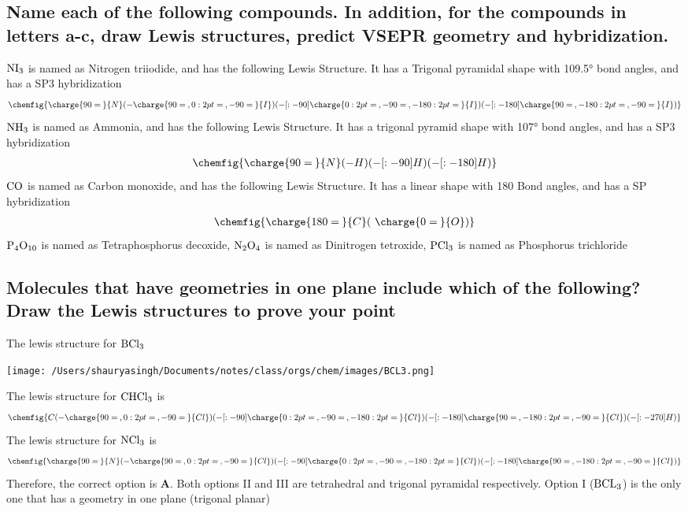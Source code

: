 \documentclass[11pt]{article}
\begin{document}
\subsection{Name each of the following compounds. In addition, for the compounds in letters a-c, draw Lewis structures, predict VSEPR geometry and hybridization.}
\label{sec:org7ee3150}
\(\ce{NI3}\) is named as Nitrogen triiodide, and has the following Lewis Structure. It has a Trigonal pyramidal shape with 109.5° bond angles, and has a SP3 hybridization
\begin{align}
\chemfig{\charge{90=\:}{N}(-\charge{90=\:, 0:2pt=\:, -90=\:}{I})(-[:-90]\charge{0:2pt=\:, -90=\:, -180:2pt=\:}{I})(-[:-180]\charge{90=\:, -180:2pt=\:, -90=\:}{I})}
\end{align}
\(\ce{NH3}\) is named as Ammonia, and has the following Lewis Structure. It has a trigonal pyramid shape with 107° bond angles, and has a SP3 hybridization
\begin{align}
\chemfig{\charge{90=\:}{N}(-{H})(-[:-90]{H})(-[:-180]{H})}
\end{align}
\(\ce{CO}\) is named as Carbon monoxide, and has the following Lewis Structure. It has a linear shape with 180\textdegree{} Bond angles, and has a SP hybridization
\begin{align}
\chemfig{\charge{180=\:}{C}(~\charge{0=\:}{O})}
\end{align}
\(\ce{P4O10}\) is named as Tetraphosphorus decoxide,
\(\ce{N2O4}\) is named as Dinitrogen tetroxide,
\(\ce{PCl3}\) is named as Phosphorus trichloride

\subsection{Molecules that have geometries in one plane include which of the following? Draw the Lewis structures to prove your point}
\label{sec:orgfbc547c}
The lewis structure for \(\ce{BCl3}\)
\begin{center}
\texttt{[image: /Users/shauryasingh/Documents/notes/class/orgs/chem/images/BCL3.png]}
\end{center}
The lewis structure for \(\ce{CHCl3}\) is
\begin{align}
\chemfig{{C}(-\charge{90=\:, 0:2pt=\:, -90=\:}{Cl})(-[:-90]\charge{0:2pt=\:, -90=\:, -180:2pt=\:}{Cl})(-[:-180]\charge{90=\:, -180:2pt=\:, -90=\:}{Cl})(-[:-270]{H})}
\end{align}
The lewis structure for \(\ce{NCl3}\) is
\begin{align}
\chemfig{\charge{90=\:}{N}(-\charge{90=\:, 0:2pt=\:, -90=\:}{Cl})(-[:-90]\charge{0:2pt=\:, -90=\:, -180:2pt=\:}{Cl})(-[:-180]\charge{90=\:, -180:2pt=\:, -90=\:}{Cl})}
\end{align}
Therefore, the correct option is \textbf{A}. Both options II and III are tetrahedral and trigonal pyramidal respectively. Option I (\(\ce{BCL3}\)) is the only one that has a geometry in one plane (trigonal planar)
\end{document}
